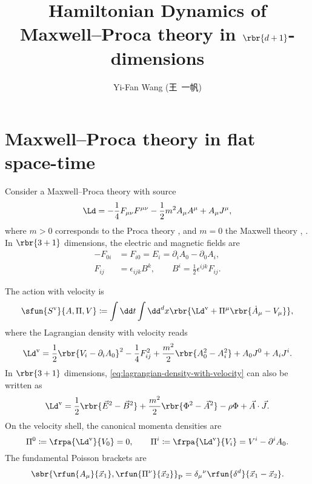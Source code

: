 \documentclass[a4paper,11pt]{article}
\title{Hamiltonian Dynamics of Maxwell--Proca theory in $\rbr{d+1}$-dimensions}
\author{Yi-Fan Wang (王\ 一帆)}
\begin{document}
\maketitle


\section{Maxwell--Proca theory in flat space-time}

Consider a Maxwell--Proca theory with source
\begin{equation}
\Ld = -\frac{1}{4} F_{\mu\nu} F^{\mu\nu} - \frac{1}{2} m^2 A_\mu A^\mu
+ A_\mu J^\mu,
\end{equation}
where $m > 0$ corresponds to the Proca theory \cite[sec.\ 2.3]{Gitman1990}, and 
$m = 0$ the Maxwell theory \cite[sec.\ 3.3.3]{Rothe2010}, \cite[sec.\ 
2.4]{Gitman1990}. In $\rbr{3+1}$ dimensions, the electric and magnetic fields 
are
\begin{align}
-F_{0i} &= F_{i0} = E_i = \partial_i A_0 - \partial_0 A_i, \\
F_{ij} &= \epsilon_{ijk}B^k, \qquad
B^i = \frac{1}{2} \epsilon^{ijk} F_{ij}.
\end{align}

The action with velocity is
\begin{align}
 \sfun{S^\text{v}}{A, \Pi, V} \coloneqq \int\dd t\int\dd^d x
\rbr{\Ld^\text{v} + \Pi^\mu\rbr{\dot A_\mu-V_\mu}},
\end{align}
where the Lagrangian density with velocity reads
\begin{align}
\Ld^\text{v} = \frac{1}{2} \rbr{V_i - \partial_i A_0}^2 - \frac{1}{4} F_{ij}^2 
+ \frac{m^2}{2} \rbr{A_0^2 - A_i^2} + A_0 J^0 + A_i J^i.
\label{eq:lagrangian-density-with-velocity}
\end{align}
In $\rbr{3+1}$ dimensions, \cref{eq:lagrangian-density-with-velocity} can also 
be written as
\begin{align}
\Ld^\text{v} = \frac{1}{2} \rbr{\vec E^2 - \vec B^2}
+ \frac{m^2}{2} \rbr{\Phi^2 - \vec A^2} - \rho\Phi + \vec A\cdot\vec J.
\end{align}
On the velocity shell, the canonical momenta densities are
\begin{equation}
\Pi^0 \coloneqq \frpa{\Ld^\text{v}}{V_0} = 0,\qquad
\Pi^i \coloneqq \frpa{\Ld^\text{v}}{V_i} = V^i - \partial^i A_0.
\end{equation}
The fundamental Poisson brackets are
\begin{equation}
\sbr{\rfun{A_\mu}{\vec x_1}, \rfun{\Pi^\nu}{\vec x_2}}_\text{P} =
\delta_\mu{}^\nu\rfun{\delta^d}{\vec x_1 - \vec x_2}.
\end{equation}
\end{document}
